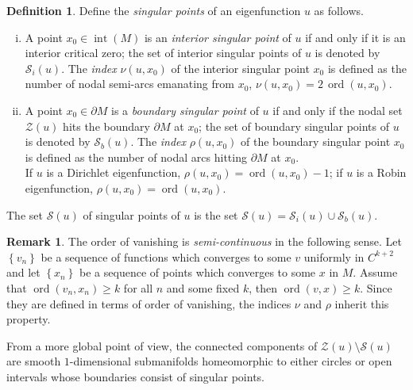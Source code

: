 \documentclass[12pt,a4paper]{amsart}
\theoremstyle{plain} %
\theoremstyle{definition}
\newtheorem{definition}[theorem]{Definition}
\newtheorem{remark}[theorem]{Remark}
\numberwithin{equation}{section}
\numberwithin{figure}{section}
\numberwithin{table}{section}
\newcommand{\cS}{\mathcal{S}}
\newcommand{\cZ}{\mathcal{Z}}
\DeclareMathOperator{\inte}{int}
\DeclareMathOperator{\ord}{ord}
\newcommand{\sm}{\!\setminus\!}
\newcommand{\set}[1]{\left\lbrace #1 \right\rbrace}
\begin{document}
\begin{definition}\label{D-evp2-0}
Define the \emph{singular points} of an eigenfunction $u$ as follows.
\begin{enumerate}[(i)]
\item A point $x_0 \in \inte(M)$ is an \emph{interior singular point} of $u$ if and only if it is an interior critical zero; the set of interior singular points of $u$ is denoted by $\cS_i(u)$. The \emph{index} $\nu(u,x_0)$ of the interior singular point $x_0$ is defined as the number of nodal semi-arcs emanating from $x_0$, $\nu(u,x_0) = 2\, \ord(u,x_0)$.
  \item A point $x_0 \in \partial M$ is a \emph{boundary singular point} of $u$ if and only if the nodal set $\cZ(u)$ hits the boundary $\partial M$ at $x_0$; the set of boundary singular points of $u$ is denoted by $\cS_b(u)$. The \emph{index} $\rho(u,x_0)$ of the boundary singular point $x_0$ is defined as the number of nodal arcs hitting $\partial M$ at $x_0$.\\
      If $u$ is a Dirichlet eigenfunction, $\rho(u,x_0) = \ord(u,x_0) - 1$; if $u$ is a Robin eigenfunction, $\rho(u,x_0) = \ord(u,x_0)$.
\end{enumerate}
The set $\cS(u)$ of singular points of $u$ is the set $\cS(u) = \cS_i(u) \cup \cS_b(u)$.
\end{definition}%

\begin{remark}\label{R-evp2-2}
The order of vanishing is \emph{semi-continuous} in the following sense. Let $\set{v_n}$ be a sequence of functions which converges to some $v$ uniformly in $C^{k+2}$ and let $\set{x_n}$ be a sequence of points which converges to some $x$ in $M$. Assume that $\ord(v_n,x_n) \ge k$ for all $n$ and some fixed $k$, then $\ord(v,x) \ge k$. Since they are defined in terms of order of vanishing, the indices $\nu$ and $\rho$ inherit this property.
\end{remark}%

 From a more global point of view, the connected components of $\cZ(u) \sm \cS(u)$ are smooth $1$-dimensional submanifolds homeomorphic to either circles or open intervals whose boundaries consist of singular points.
\end{document}
